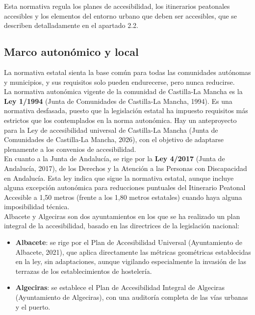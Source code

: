 Esta normativa regula los planes de accesibilidad, los itinerarios peatonales accesibles y los elementos del entorno urbano que deben ser accesibles, que se describen detalladamente en el apartado 2.2.
\\

\subsection{Marco autonómico y local}
La normativa estatal sienta la base común para todas las comunidades autónomas y municipios, y sus requisitos solo pueden endurecerse, pero nunca reducirse.
\\

La normativa autonómica vigente de la comunidad de Castilla-La Mancha es la \textbf{Ley 1/1994} (Junta de Comunidades de Castilla-La Mancha, 1994). Es una normativa desfasada, puesto que la legislación estatal ha impuesto requisitos más estrictos que los contemplados en la norma autonómica. Hay un anteproyecto para la Ley de accesibilidad universal de Castilla-La Mancha (Junta de Comunidades de Castilla-La Mancha, 2026), con el objetivo de adaptarse plenamente a los convenios de accesibilidad.
\\

En cuanto a la Junta de Andalucía, se rige por la \textbf{Ley 4/2017} (Junta de Andalucía, 2017), de los Derechos y la Atención a las Personas con Discapacidad en Andalucía. Esta ley indica que sigue la normativa estatal, aunque incluye alguna excepción autonómica para reducciones puntuales del Itinerario Peatonal Accesible a 1,50 metros (frente a los 1,80 metros estatales) cuando haya alguna imposibilidad técnica.
\\

Albacete y Algeciras son dos ayuntamientos en los que se ha realizado un plan integral de la accesibilidad, basado en las directrices de la legislación nacional:
\begin{itemize}
    \item \textbf{Albacete}: se rige por el Plan de Accesibilidad Universal (Ayuntamiento de Albacete, 2021), que aplica directamente las métricas geométricas establecidas en la ley, sin adaptaciones, aunque vigilando especialmente la invasión de las terrazas de los establecimientos de hostelería.
    \item \textbf{Algeciras}: se establece el Plan de Accesibilidad Integral de Algeciras (Ayuntamiento de Algeciras), con una auditoría completa de las vías urbanas y el puerto.
\end{itemize}

